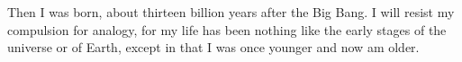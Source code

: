 \documentclass[./butidigress.tex]{subfiles}
\begin{document}

Then I was born, about thirteen billion years after the Big Bang.
I will resist my compulsion for analogy, for my life has been nothing like the early stages of the universe or of Earth, except in that I was once younger and now am older.

\end{document}
